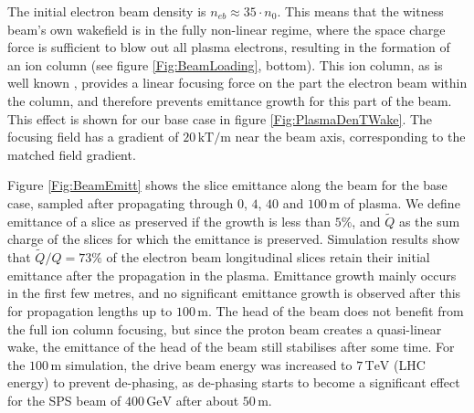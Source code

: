 \documentclass[aps,prstab,reprint,amsmath,amssymb,groupedaddress]{revtex4-1}
\newcommand{\unit}[1]{\,\mathrm{#1}}
\begin{document}
The initial electron beam density is $n_{eb} \approx 35\cdot n_{0}$. This means that the witness beam's own wakefield
is in the fully non-linear regime, where the space charge force is sufficient to blow out all plasma electrons,
resulting in the formation of an ion column (see figure \ref{Fig:BeamLoading}, bottom). This ion column, as is well
known \cite{rosenzweig:1991}, provides a linear focusing force on the part the electron beam within the column, and
therefore prevents emittance growth for this part of the beam. This effect is shown for our base case in figure
\ref{Fig:PlasmaDenTWake}. The focusing field has a gradient of $20\unit{kT/m}$ near the beam axis, corresponding to the
matched field gradient.



Figure \ref{Fig:BeamEmitt} shows the slice emittance along the beam for the base case, sampled after propagating through
$0$, $4$, $40$ and $100\unit{m}$ of plasma. We define emittance of a slice as preserved if the growth is less than
$5\%$, and $\widetilde{Q}$ as the sum charge of the slices for which the emittance is preserved. Simulation results show
that $\widetilde{Q}/Q = 73\%$ of the electron beam longitudinal slices retain their initial emittance after the
propagation in the plasma. Emittance growth mainly occurs in the first few metres, and no significant emittance growth
is observed after this for propagation lengths up to $100\unit{m}$. The head of the beam does not benefit from the full
ion column focusing, but since the proton beam creates a quasi-linear wake, the emittance of the head of the beam still
stabilises after some time. For the $100\unit{m}$ simulation, the drive beam energy was increased to $7\unit{TeV}$ (LHC
energy) to prevent de-phasing, as de-phasing starts to become a significant effect for the SPS beam of $400\unit{GeV}$
after about $50\unit{m}$.
\end{document}
